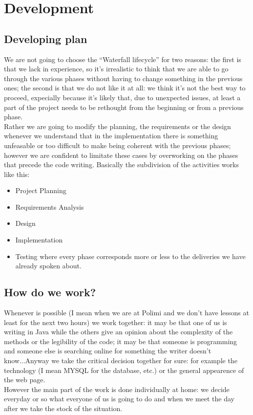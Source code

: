 \documentclass[a4paper,12pt]{article}
\begin{document}
\clearpage

\section{Development}
\subsection{Developing plan}
We are not going to choose the “Waterfall lifecycle” for two reasons: the first is that we lack in experience, so it’s irrealistic to think that we are able to go through the various phases without having to change something in the previous ones; the second is that we do not like it at all: we think it’s not the best way to proceed, expecially because it’s likely that, due to unexpected issues, at least a part of the project needs to be rethought from the beginning or from a previous phase.\\[1\baselineskip]Rather we are going to modify the planning, the requirements or the design whenever we understand that in the implementation there is something unfeasable or too difficult to make being coherent with the previous phases; however we are confident to limitate these cases by overworking on the phases that precede the code writing. Basically the subdivision of the activities works like this:
\begin{itemize}
\item Project Planning
\item Requirements Analysis
\item Design
\item Implementation
\item Testing
where every phase corresponds more or less to the deliveries
we have already spoken about.
\end{itemize}

\subsection{How do we work?}
Whenever is possible (I mean when we are at Polimi and we don’t have lessons at least for the next two hours) we work together: it may be that one of us is writing in Java while the others give an opinion about the complexity of the methods or the legibility of the code; it may be that someone is programming and someone else is searching online for something the writer doesn’t know...Anyway we take the critical decision together for sure: for example the technology (I mean MYSQL for the database, etc.) or the general appearence of the web page.\\[1\baselineskip]However the main part of the work is done individually at home: we decide everyday or so what everyone of us is going to do and when we meet the day after we take the stock of the situation.
\end{document}
